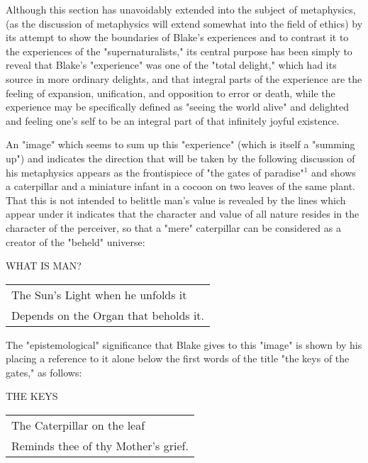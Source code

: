 Although this section has unavoidably extended into the subject of metaphysics, (as the discussion of metaphysics
will extend somewhat into the field of ethics) by its attempt to show the boundaries
of Blake's experiences and to contrast it to the experiences of the "supernaturalists," its central
purpose has been simply to reveal that Blake's "experience" was one of the "total delight,"
which had its source in more ordinary delights, and that integral parts of the experience are
the feeling of expansion, unification, and opposition to error or death, while the experience may be
specifically defined as "seeing the world alive" and delighted and feeling one's self to be an integral part
of that infinitely joyful existence.\par
\vspace*{0.5\baselineskip}
An "image" which seems to sum up this "experience" (which is itself a "summing up") and indicates the
direction that will be taken by the following discussion of his metaphysics appears as the frontispiece of
"the gates of paradise"$^{1}$ and shows a caterpillar and a miniature infant in a cocoon on two leaves
of the same plant. That this is not intended to belittle man's value is revealed by the lines which
appear under it indicates that the character and value of all nature resides in the character of the perceiver,
so that a "mere" caterpillar can be considered as a creator of the "beheld" universe:\par
\begin{center}
	\parbox{0.8\textwidth}{
		\centering
		WHAT IS MAN?\par
		\null\par
		\begin{tabular}{l}
			The Sun's Light when he unfolds it \\
			Depends on the Organ that beholds it.
		\end{tabular}
	}%
\end{center}
The "epistemological" significance that Blake gives to this "image" is shown by his placing
a reference to it alone below the first words of the title "the keys of the gates," as follows:\par
\begin{center}
	\parbox{0.8\textwidth}{
		\centering
		THE KEYS\par
		\null\par
		\begin{tabular}{l}
			The Caterpillar on the leaf \\
			Reminds thee of thy Mother's grief.
		\end{tabular}
	}%
\end{center}
